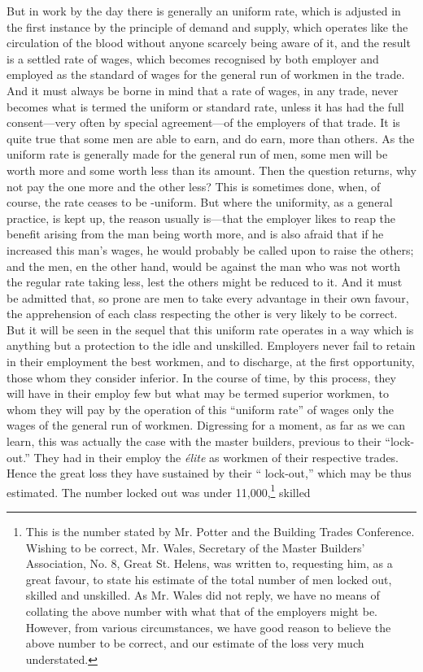 But in work by the day there is generally an uniform rate, which is
adjusted in the first instance by the principle of demand and supply,
which operates like the circulation of the blood without anyone scarcely
being aware of it, and the result is a settled rate of wages, which
becomes recognised by both employer and employed as the standard of
wages for the general run of workmen in the trade. And it must always be
borne in mind that a rate of wages, in any trade, never becomes what is
termed the uniform or standard rate, unless it has had the full
consent---very often by special agreement---of the employers of that
trade. It is quite true that some men are able to earn, and do earn,
more than others. As the uniform rate is generally made for the general
run of men, some men will be worth more and some worth less than its
amount. Then the question returns, why not pay the one more and the
other less? This is sometimes done, when, of course, the rate ceases to
be -uniform. But where the uniformity, as a general practice, is kept
up, the reason usually is---that the employer likes to reap the benefit
arising from the man being worth more, and is also afraid that if he
increased this man's wages, he would probably be called upon to raise
the others; and the men, en the other hand, would be against the man who
was not worth the regular rate taking less, lest the others might be
reduced to it. And it must be admitted that, so prone are men to take
every advantage in their own favour, the apprehension of each class
respecting the other is very likely to be correct. But it will be seen
in the sequel that this uniform rate operates in a way which is anything
but a protection to the idle and unskilled. Employers never fail to
retain in their employment the best workmen, and to discharge, at the
first opportunity, those whom they consider inferior. In the course of
time, by this process, they will have in their employ few but what may
be termed superior workmen, to whom they will pay by the operation of
this ``uniform rate'' of wages only the wages of the general run of
workmen. Digressing for a moment, as far as we can learn, this was
actually the case with the master builders, previous to their
``lock-out.'' They had in their employ the \textit{élite} as workmen of
their respective trades. Hence the great loss they have sustained by
their `` lock-out,'' which may be thus estimated. The number locked out
was under 11,000,\footnote{This is the number stated by Mr. Potter and
the Building Trades Conference. Wishing to be correct, Mr. Wales,
Secretary of the Master Builders' Association, No. 8, Great St. Helens,
was written to, requesting him, as a great favour, to state his estimate
of the total number of men locked out, skilled and unskilled. As Mr.
Wales did not reply, we have no means of collating the above number with
what that of the employers might be. However, from various
circumstances, we have good reason to believe the above number to be
correct, and our estimate of the loss very much understated.} skilled
